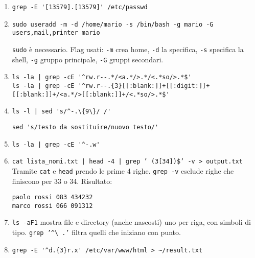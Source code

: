 \documentclass{report}
\begin{document}
\begin{enumerate}
\item 
\begin{verbatim}
grep -E '[13579].[13579]' /etc/passwd
\end{verbatim}

\item 
\begin{verbatim}
sudo useradd -m -d /home/mario -s /bin/bash -g mario -G users,mail,printer mario
\end{verbatim}
\texttt{sudo} è necessario. Flag usati: \texttt{-m} crea home, \texttt{-d} la specifica, \texttt{-s} specifica la shell, \texttt{-g} gruppo principale, \texttt{-G} gruppi secondari.

\item 
\begin{verbatim}
ls -la | grep -cE '^rw.r--.*/<a.*/>.*/<.*so/>.*$'
ls -la | grep -cE '^rw.r--.{3}[[:blank:]]+[[:digit:]]+[[:blank:]]+/<a.*/>[[:blank:]]+/<.*so/>.*$'
\end{verbatim}

\item 
\begin{verbatim}
ls -l | sed 's/^-.\{9\}/ /'
\end{verbatim}
\begin{verbatim}
sed 's/testo da sostituire/nuovo testo/'
\end{verbatim}

\item 
\begin{verbatim}
ls -la | grep -cE '^-.w'
\end{verbatim}
\newpage
\item 
\texttt{cat lista\_nomi.txt | head -4 | grep '\ (3\textbar{}[34])\$' -v > output.txt} \\
Tramite \texttt{cat} e \texttt{head} prendo le prime 4 righe. \texttt{grep -v} esclude righe che finiscono per 33 o 34. Risultato:
\begin{verbatim}
paolo rossi 083 434232
marco rossi 066 091312
\end{verbatim}

\item 
\texttt{ls -aF1} mostra file e directory (anche nascosti) uno per riga, con simboli di tipo. \texttt{grep '\textasciicircum\textbackslash
.'} filtra quelli che iniziano con punto.
 
\item 
\begin{verbatim}
grep -E '^d.{3}r.x' /etc/var/www/html > ~/result.txt
\end{verbatim}


\end{enumerate}
\end{document}
